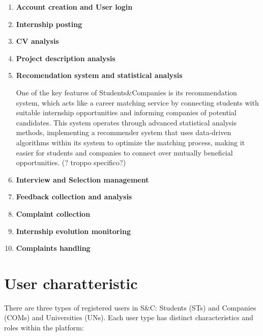 \begin{enumerate}

\item \textbf{Account creation and User login}

\item \textbf{Internship posting}

\item \textbf{CV analysis}

\item \textbf{Project description analysis}

\item \textbf{Recomendation system and statistical analysis}

One of the key features of Students\&Companies is its recommendation system, which acts like a career matching service by connecting students with suitable internship opportunities and informing companies of potential candidates. This system operates through advanced statistical analysis methods, implementing a recommender system that uses data-driven algorithms within its system to optimize the matching process, making it easier for students and companies to connect over mutually beneficial opportunities. (? troppo specifico?)

\item \textbf{Interview and Selection management}

\item \textbf{Feedback collection and analysis}

\item \textbf{Complaint collection}

\item \textbf{Internship evolution monitoring}

\item \textbf{Complaints handling}

\end{enumerate}

\pagebreak
\section{User charatteristic}

There are three types of registered users in S\&C: Students (STs) and Companies (COMs) and Universities (UNs). Each user type has distinct characteristics and roles within the platform:

